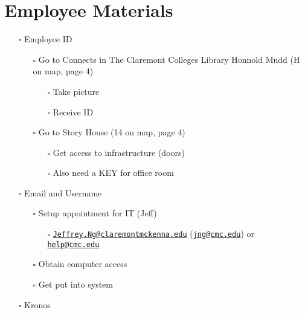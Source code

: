 \documentclass[
]{book}
\providecommand{\tightlist}{%
  \setlength{\itemsep}{0pt}\setlength{\parskip}{0pt}}
\begin{document}
\hypertarget{employee-materials}{%
\chapter{Employee Materials}\label{employee-materials}}

\begin{itemize}
\tightlist
\item[$\square$]
  Employee ID

  \begin{itemize}
  \tightlist
  \item[$\square$]
    Go to Connects in The Claremont Colleges Library Honnold Mudd (H on map, page 4)

    \begin{itemize}
    \tightlist
    \item[$\square$]
      Take picture
    \item[$\square$]
      Receive ID
    \end{itemize}
  \item[$\square$]
    Go to Story House (14 on map, page 4)

    \begin{itemize}
    \tightlist
    \item[$\square$]
      Get access to infrastructure (doors)
    \item[$\square$]
      Also need a KEY for office room
    \end{itemize}
  \end{itemize}
\item[$\square$]
  Email and Username

  \begin{itemize}
  \tightlist
  \item[$\square$]
    Setup appointment for IT (Jeff)

    \begin{itemize}
    \tightlist
    \item[$\square$]
      \href{mailto:Jeffrey.Ng@claremontmckenna.edu}{\nolinkurl{Jeffrey.Ng@claremontmckenna.edu}} (\href{mailto:jng@cmc.edu}{\nolinkurl{jng@cmc.edu}}) or \href{mailto:help@cmc.edu}{\nolinkurl{help@cmc.edu}}
    \end{itemize}
  \item[$\square$]
    Obtain computer access
  \item[$\square$]
    Get put into system
  \end{itemize}
\item[$\square$]
  Kronos


\end{itemize}
\end{document}
